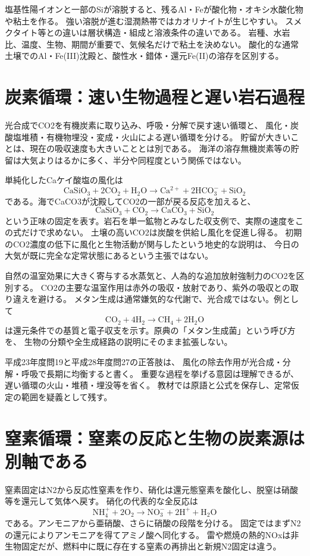 塩基性陽イオンと一部のSiが溶脱すると、残るAl・Feが酸化物・オキシ水酸化物や粘土を作る。
強い溶脱が進む湿潤熱帯ではカオリナイトが生じやすい。
スメクタイト等との違いは層状構造・組成と溶液条件の違いである。
岩種、水岩比、温度、生物、期間が重要で、気候名だけで粘土を決めない\cite{gc_clays,gc_hem}。
酸化的な通常土壌でのAl・Fe(III)沈殿と、酸性水・錯体・還元Fe(II)の溶存を区別する。

\section{炭素循環：速い生物過程と遅い岩石過程}
\label{theory:geochemistry:carbon}
光合成でCO2を有機炭素に取り込み、呼吸・分解で戻す速い循環と、
風化・炭酸塩堆積・有機物埋没・変成・火山による遅い循環を分ける\cite{gc_carbon}。
貯留が大きいことは、現在の吸収速度も大きいこととは別である。
海洋の溶存無機炭素等の貯留は大気よりはるかに多く、半分や同程度という関係ではない。

単純化したCaケイ酸塩の風化は
\[
 \mathrm{CaSiO_3+2CO_2+H_2O\longrightarrow Ca^{2+}+2HCO_3^-+SiO_2}
\]
である。海でCaCO3が沈殿してCO2の一部が戻る反応を加えると、
\[
 \mathrm{CaSiO_3+CO_2\longrightarrow CaCO_3+SiO_2}
\]
という正味の固定を表す。岩石を単一鉱物とみなした収支例で、実際の速度をこの式だけで求めない。
土壌の高いCO2は炭酸を供給し風化を促進し得る。
初期のCO2濃度の低下に風化と生物活動が関与したという地史的な説明は、
今日の大気が既に完全な定常状態にあるという主張ではない。

自然の温室効果に大きく寄与する水蒸気と、人為的な追加放射強制力のCO2を区別する。
CO2の主要な温室作用は赤外の吸収・放射であり、紫外の吸収との取り違えを避ける。
メタン生成は通常嫌気的な代謝で、光合成ではない。例として
\[
 \mathrm{CO_2+4H_2\longrightarrow CH_4+2H_2O}
\]
は還元条件での基質と電子収支を示す。原典の「メタン生成菌」という呼び方を、
生物の分類や全生成経路の説明にそのまま拡張しない。
\begin{tcolorbox}[title=炭素の収支を閉じるために]
平成23年度問19と平成28年度問27の正答肢は、
風化の除去作用が光合成・分解・呼吸で長期に均衡すると書く。
重要な過程を挙げる意図は理解できるが、遅い循環の火山・堆積・埋没等を省く。
教材では原語と公式を保存し、定常仮定の範囲を疑義として残す。
\end{tcolorbox}

\section{窒素循環：窒素の反応と生物の炭素源は別軸である}
\label{theory:geochemistry:nitrogen}
窒素固定はN2から反応性窒素を作り、硝化は還元態窒素を酸化し、脱窒は硝酸等を還元して気体へ戻す。
硝化の代表的な全反応は
\[
 \mathrm{NH_4^++2O_2\longrightarrow NO_3^-+2H^++H_2O}
\]
である。アンモニアから亜硝酸、さらに硝酸の段階を分ける。
固定ではまずN2の還元によりアンモニアを得てアミノ酸へ同化する。
雷や燃焼の熱的NOxは非生物固定だが、燃料中に既に存在する窒素の再排出と新規N2固定は違う。

